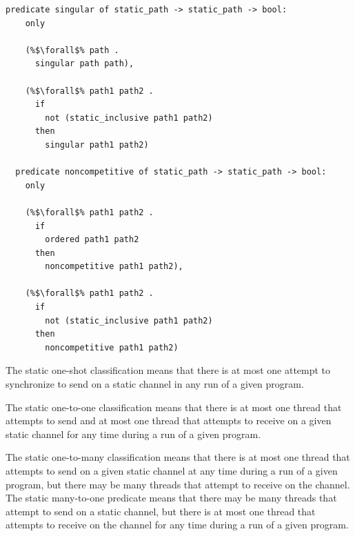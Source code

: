 \documentclass{article}
\begin{document}
\begin{lstlisting}[language=logic, escapechar=\%]
  predicate singular of static_path -> static_path -> bool:
    only

    (%$\forall$% path .
      singular path path),

    (%$\forall$% path1 path2 .
      if
        not (static_inclusive path1 path2)
      then
        singular path1 path2)

  predicate noncompetitive of static_path -> static_path -> bool:
    only

    (%$\forall$% path1 path2 .
      if
        ordered path1 path2
      then
        noncompetitive path1 path2),

    (%$\forall$% path1 path2 .
      if
        not (static_inclusive path1 path2)
      then
        noncompetitive path1 path2)
\end{lstlisting}


The static one-shot classification means that there is at most one attempt
to synchronize to send on a static channel in any run of a given program.

The static one-to-one classification means that there is at most one thread that attempts to
send and at most one thread that attempts to receive on a given static channel for any time
during a run of a given program.

The static one-to-many classification means that there is at most one thread that attempts to
send on a given static channel at any time during a run of a given program, but there may be
many threads that attempt to receive on the channel. The static many-to-one predicate means
that there may be many threads that attempt to send on a static channel, but there is at most
one thread that attempts to receive on the channel for any time during a run of a given
program.
\end{document}
